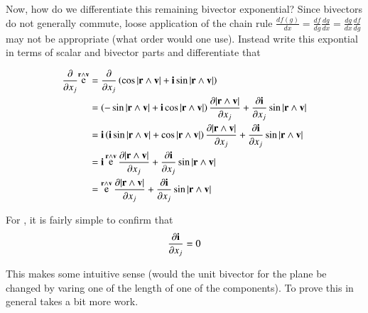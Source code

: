 \documentclass{article}      %
\newcommand{\dxj}[2] {\frac {\partial {#1}} {\partial {x_{#2}}}}
\DeclareMathOperator{\Exp}{e}
\begin{document}
Now, how do we differentiate this remaining bivector exponential?  Since bivectors do not generally commute, loose application of the 
chain rule $\frac{df(g)}{dx} = \frac{df}{dg}\frac{dg}{dx} = \frac{dg}{dx}\frac{df}{dg}$ may not be appropriate (what order would one use).  Instead
write this expontial in terms of scalar and bivector parts and differentiate that

\begin{align*}
\dxj{}{j}{\Exp^{\Br \wedge \Bv}} 
&= \dxj{}{j} \left( \cos{\abs{\Br \wedge \Bv}} + \Bi \sin{\abs{\Br \wedge \Bv}} \right) \\
&= \left(-\sin{\abs{\Br \wedge \Bv}} + \Bi \cos{\abs{\Br \wedge \Bv}} \right)\dxj{\abs{\Br \wedge \Bv}}{j} + \dxj{\Bi}{j} \sin{\abs{\Br \wedge \Bv}} \\
&= \Bi\left(\Bi\sin{\abs{\Br \wedge \Bv}} + \cos{\abs{\Br \wedge \Bv}} \right)\dxj{\abs{\Br \wedge \Bv}}{j} + \dxj{\Bi}{j} \sin{\abs{\Br \wedge \Bv}} \\
&= \Bi\Exp^{\Br \wedge \Bv} \dxj{\abs{\Br \wedge \Bv}}{j} + \dxj{\Bi}{j} \sin{\abs{\Br \wedge \Bv}} \\
&= \Exp^{\Br \wedge \Bv} \dxj{\abs{\Br \wedge \Bv}}{j} + \dxj{\Bi}{j} \sin{\abs{\Br \wedge \Bv}} \\
\end{align*}

For , it is fairly simple to confirm that 
\[
\dxj{\Bi}{j} = 0 
\]

This makes some intuitive sense (would the unit bivector for the plane be changed by varing one of the length of one of the components).  To prove this
in general takes a bit more work.
\end{document}
